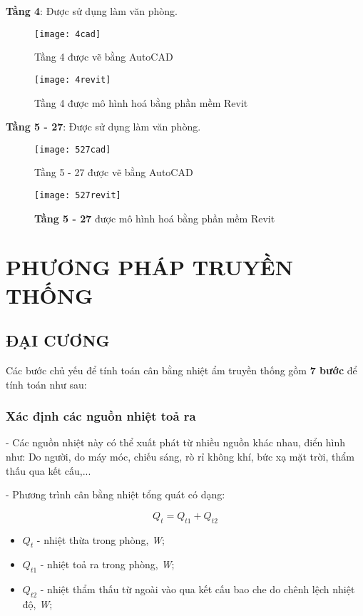 \newpage
\textbf{Tầng 4}: Được sử dụng làm văn phòng.

\begin{figure}[H]
	\centering
	\texttt{[image: 4cad]}
	\caption{Tầng 4 được vẽ bằng AutoCAD}
	\label{4cad}
\end{figure}

\begin{figure}[H]
	\centering
	\texttt{[image: 4revit]}
	\caption{Tầng 4 được mô hình hoá bằng phần mềm Revit}
	\label{4revit}
\end{figure} 

\newpage
\textbf{Tầng 5 - 27}: Được sử dụng làm văn phòng.

\begin{figure}[H]
	\centering
	\texttt{[image: 527cad]}
	\caption{Tầng 5 - 27 được vẽ bằng AutoCAD}
	\label{527cad}
\end{figure}

\begin{figure}[H]
	\centering
	\texttt{[image: 527revit]}
	\caption{\textbf{Tầng 5 - 27} được mô hình hoá bằng phần mềm Revit}
	\label{527revit}
\end{figure} 

\section{PHƯƠNG PHÁP TRUYỀN THỐNG}
\subsection{ĐẠI CƯƠNG}
Các bước chủ yếu để tính toán cân bằng nhiệt ẩm truyền thống gồm \textbf{7 bước} để tính toán như sau:
\subsubsection{Xác định các nguồn nhiệt toả ra}
- Các nguồn nhiệt này có thể xuất phát từ nhiều nguồn khác nhau, điển hình như: Do người, do máy móc, chiếu sáng, rò rỉ không khí, bức xạ mặt trời, thẩm thấu qua kết cấu,...

- Phương trình cân bằng nhiệt tổng quát có dạng:

\begin{equation}
	Q_{t} = Q_{t1} + Q_{t2}
\end{equation}

\begin{itemize}[leftmargin = 3cm, label = $\star$]
	\item $Q_{t}$ - nhiệt thừa trong phòng, \textit{W};
	\item $Q_{t1}$ - nhiệt toả ra trong phòng, \textit{W};
	\item $Q_{t2}$ - nhiệt thẩm thấu từ ngoài vào qua kết cấu bao che do chênh lệch nhiệt độ, \textit{W};
\end{itemize}


